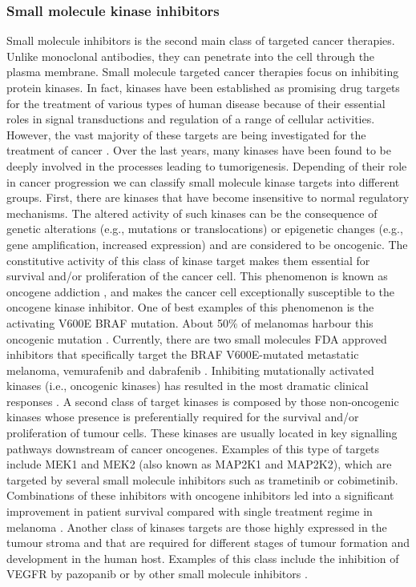 \documentclass[12pt, b5paper,twoside]{tesi_upf}
\begin{document}
\subsubsection{Small molecule kinase inhibitors}\label{kinases}

\par Small molecule inhibitors is the second main class of targeted cancer therapies.  Unlike monoclonal antibodies, they can penetrate into the cell through the plasma membrane. Small molecule targeted cancer therapies focus on inhibiting protein kinases. In fact, kinases have been established as promising drug targets for the treatment of various types of human disease because of their essential roles in signal transductions and regulation of a range of cellular activities. However, the vast majority of these targets are being investigated for the treatment of cancer \cite{Zhang2009}.  Over the last years,  many kinases have been found to be deeply involved in the processes leading to tumorigenesis. Depending of their role in cancer progression we can classify small molecule kinase targets into different groups.  First, there are kinases that have become insensitive to normal regulatory mechanisms. The altered activity of such kinases can be the consequence of genetic alterations (e.g., mutations or translocations) or epigenetic changes (e.g., gene amplification, increased expression) and are considered to be oncogenic. The constitutive activity of this class of kinase target makes them essential for survival and/or proliferation of the cancer cell. This phenomenon is known as oncogene addiction \cite{Weinstein2006}, and makes the cancer cell exceptionally susceptible to the oncogene kinase inhibitor. One of best examples of this phenomenon is the activating V600E BRAF mutation. About 50$\%$ of melanomas harbour this oncogenic mutation \cite{Ascierto2012}. Currently, there are two small molecules FDA approved inhibitors that specifically target the BRAF V600E-mutated metastatic melanoma, vemurafenib \cite{Bollag2010} and dabrafenib \cite{Gibney2013}. Inhibiting mutationally activated kinases (i.e., oncogenic kinases) has resulted in the most dramatic clinical responses \cite{Zhang2009}.  A second class of target kinases is composed by those non-oncogenic kinases whose presence is preferentially required for the survival and/or proliferation of tumour cells.  These kinases are usually located in key signalling pathways downstream of cancer oncogenes. Examples of this type of targets include MEK1 and MEK2 (also known as MAP2K1 and MAP2K2), which are targeted by several small molecule inhibitors such as trametinib or cobimetinib. Combinations of these inhibitors with oncogene inhibitors led into a significant improvement in patient survival compared with single treatment regime in melanoma \cite{Flaherty2012, Flaherty2012a}. Another class of kinases targets are those highly expressed in the tumour stroma and that are required for different stages of tumour formation and development in the human host. Examples of this class include the inhibition of VEGFR by pazopanib or by other small molecule inhibitors \cite{Ivy2009}.
 
\end{document}
